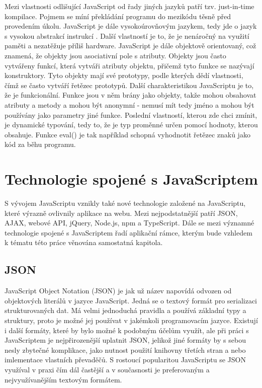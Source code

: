 Mezi vlastnosti odlišující JavaScript od řady jiných jazyků patří tzv. just-in-time kompilace. Pojmem se míní překládání programu do mezikódu těsně před provedením úkolu. JavaScript je dále vysokoúrovňovým jazykem, tedy jde o jazyk s vysokou abstrakcí instrukcí \cite{aboutjava}. Další vlastností je to, že je nenáročný na využití paměti a nezatěžuje příliš hardware. JavaScript je dále objektově orientovaný, což znamená, že objekty jsou asociativní pole s atributy. Objekty jsou často vytvářeny funkcí, která vytváři atributy objektu, přičemž tyto funkce se nazývají konstruktory. Tyto objekty mají své prototypy, podle kterých dědí vlastnosti, čímž se často vytváří řetězec prototypů. Další charakteristikou JavaScriptu je to, že je funkcionální. Funkce jsou v něm brány jako objekty, takže mohou obsahovat atributy a metody a mohou být anonymní - nemusí mít tedy jméno a mohou být používány jako parametry jiné funkce. Poslední vlastností, kterou zde chci zmínit, je dynamické typování, tedy to, že je typ proměnné určen pomocí hodnoty, kterou obsahuje. Funkce eval() je tak například schopná vyhodnotit řetězec znaků jako kód za běhu programu.

    \section{Technologie spojené s JavaScriptem}
S vývojem JavaScriptu vznikly také nové technologie založené na JavaScriptu, které výrazně ovlivnily aplikace na webu. Mezi nejpodstatnější patří JSON, AJAX, webové API, jQuery, Node.js, npm a TypeScript. Dále se mezi významné technologie spojené s JavaScriptem řadí aplikační rámce, kterým bude vzhledem k tématu této práce věnována samostatná kapitola.

        \subsection{JSON}
JavaScript Object Notation (JSON) je jak už název napovídá odvozen od objektových literálů v jazyce JavaScript. Jedná se o textový formát pro serializaci strukturovaných dat. Má velmi jednoduchá pravidla a používá základní typy a struktury, proto je možné jej používat v jakémkoli programovacím jazyce. Existují i další formáty, které by bylo možné k podobným účelům využít, ale při práci s JavaScriptem je nejpřirozenější uplatnit JSON, jelikož jiné formáty by s sebou nesly zbytečné komplikace, jako nutnost použití knihovny třetích stran a nebo imlementace vlastních převaděčů. S rostoucí popularitou JavaScriptu se JSON využíval v praxi čím dál častější a v současnosti je preferovaným a nejvyužívanějším textovým formátem.

